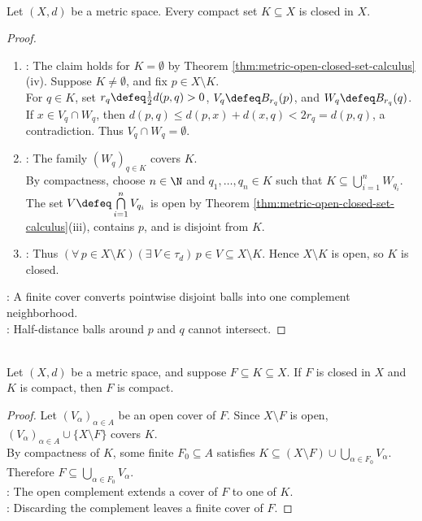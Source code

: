 \begin{theorem} \label{thm:compact-subsets-of-metric-spaces-closed} \\
Let $(X,d)$ be a metric space. Every compact set $K\subseteq X$ is closed in $X$.
\begin{proof}
\begin{enumerate}[label=(\roman*)]
\setlength{\itemsep}{0pt}
\item {}: The claim holds for $K=\emptyset$ by Theorem \ref{thm:metric-open-closed-set-calculus}(iv). Suppose $K\ne\emptyset$, and fix $p\in X\setminus K$.\\
For $q\in K$, set $r_q\defeq\frac{1}{2}d(p,q)>0$, $V_q\defeq B_{r_q}(p)$, and $W_q\defeq B_{r_q}(q)$.\\
If $x\in V_q\cap W_q$, then $d(p,q)\leq d(p,x)+d(x,q)<2r_q=d(p,q)$, a contradiction. Thus $V_q\cap W_q=\emptyset$.
\item {}: The family $(W_q)_{q\in K}$ covers $K$.\\
By compactness, choose $n\in\N$ and $q_1,\ldots,q_n\in K$ such that $K\subseteq\bigcup\limits_{i=1}^{n}W_{q_i}$.\\
The set $V\defeq\bigcap\limits_{i=1}^{n}V_{q_i}$ is open by Theorem \ref{thm:metric-open-closed-set-calculus}(iii), contains $p$, and is disjoint from $K$.
\item {}: Thus $(\forall\,p\in X\setminus K)(\exists\,V\in\tau_d)\,p\in V\subseteq X\setminus K$. Hence $X\setminus K$ is open, so $K$ is closed.
\end{enumerate}
: A finite cover converts pointwise disjoint balls into one complement neighborhood.\\
: Half-distance balls around $p$ and $q$ cannot intersect.
\end{proof}
\end{theorem}

\begin{theorem} \label{thm:closed-subsets-of-compact-sets-compact} \\
Let $(X,d)$ be a metric space, and suppose $F\subseteq K\subseteq X$. If $F$ is closed in $X$ and $K$ is compact, then $F$ is compact.
\begin{proof}
Let $(V_\alpha)_{\alpha\in A}$ be an open cover of $F$. Since $X\setminus F$ is open, $(V_\alpha)_{\alpha\in A}\cup\{X\setminus F\}$ covers $K$.\\
By compactness of $K$, some finite $F_0\subseteq A$ satisfies $K\subseteq(X\setminus F)\cup\bigcup\limits_{\alpha\in F_0}V_\alpha$. Therefore $F\subseteq\bigcup\limits_{\alpha\in F_0}V_\alpha$.\\
: The open complement extends a cover of $F$ to one of $K$.\\
: Discarding the complement leaves a finite cover of $F$.
\end{proof}
\end{theorem}

